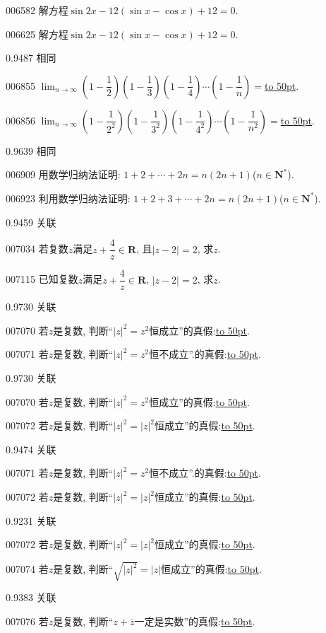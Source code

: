 \documentclass[10pt,a4paper]{article}
\newcommand{\blank}[1]{\underline{\hbox to #1pt{}}}
\begin{document}
006582	解方程$\sin 2x-12(\sin x-\cos x)+12=0$.

006625	解方程$\sin 2x-12(\sin x-\cos x)+12=0$.



0.9487 相同

006855	$\displaystyle \lim_{n\to \infty} (1-\dfrac 12)(1-\dfrac 13)(1-\dfrac 14)\cdots (1-\dfrac 1n)=$\blank{50}.

006856	$\displaystyle \lim_{n\to \infty} (1-\dfrac 1{2^2})(1-\dfrac 1{3^2})(1-\dfrac 1{4^2})\cdots (1-\dfrac 1{n^2})=$\blank{50}.



0.9639 相同

006909	用数学归纳法证明: $1+2+\cdots +2n=n(2n+1)$($n\in \mathbf{N}^*$).

006923	利用数学归纳法证明: $1+2+3+\cdots +2n=n(2n+1)$($n\in \mathbf{N}^*$).



0.9459 关联

007034	若复数$z$满足$z+\dfrac 4z\in \mathbf{R}$, 且$|z-2|=2$, 求$z$.

007115	已知复数$z$满足$z+\dfrac 4z\in \mathbf{R}$, $|z-2|=2$, 求$z$.



0.9730 关联

007070	若$z$是复数, 判断``$|z|^2=z^2$恒成立''的真假:\blank{50}.

007071	若$z$是复数, 判断``$|z|^2= z^2$恒不成立''.的真假:\blank{50}.



0.9730 关联

007070	若$z$是复数, 判断``$|z|^2=z^2$恒成立''的真假:\blank{50}.

007072	若$z$是复数, 判断``$|z|^2=|z|^2$恒成立''的真假:\blank{50}.



0.9474 关联

007071	若$z$是复数, 判断``$|z|^2= z^2$恒不成立''.的真假:\blank{50}.

007072	若$z$是复数, 判断``$|z|^2=|z|^2$恒成立''的真假:\blank{50}.



0.9231 关联

007072	若$z$是复数, 判断``$|z|^2=|z|^2$恒成立''的真假:\blank{50}.

007074	若$z$是复数, 判断``$\sqrt {|z|^2}=|z|$恒成立''的真假:\blank{50}.



0.9383 关联

007076	若$z$是复数, 判断``$z+\overline z$一定是实数''的真假:\blank{50}.
\end{document}
